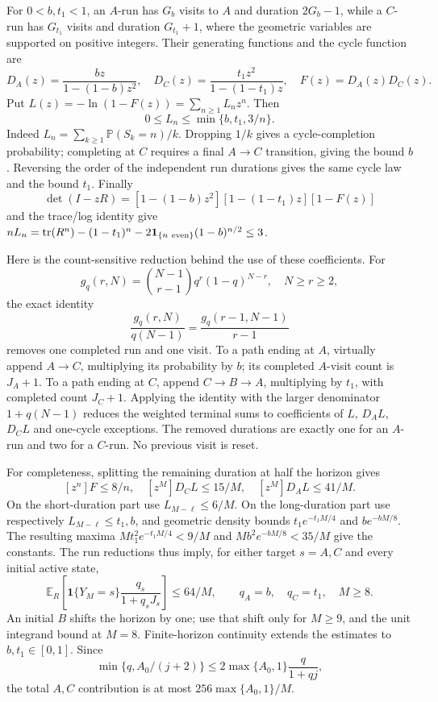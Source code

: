 \documentclass[11pt,letterpaper]{article}
\theoremstyle{definition}\newtheorem{definition}[theorem]{Definition}
\theoremstyle{remark}\newtheorem{remark}[theorem]{Remark}
\newcommand{\E}{\mathbb{E}}
\newcommand{\Prob}{\mathbb{P}}
\newcommand{\ind}{\mathbf{1}}
\begin{document}
For $0<b,t_1<1$, an $A$-run has $G_b$ visits to $A$ and duration $2G_b-1$, while a $C$-run has $G_{t_1}$ visits and duration $G_{t_1}+1$, where the geometric variables are supported on positive integers. Their generating functions and the cycle function are
\[
 D_A(z)=\frac{bz}{1-(1-b)z^2},\quad
 D_C(z)=\frac{t_1z^2}{1-(1-t_1)z},\quad
 F(z)=D_A(z)D_C(z).
\]
Put $L(z)=-\ln(1-F(z))=\sum_{n\ge1}L_nz^n$. Then
\begin{equation}\label{eq:renewalcoeff}
 0\le L_n\le\min\{b,t_1,3/n\}.
\end{equation}
Indeed $L_n=\sum_{k\ge1}\Prob(S_k=n)/k$. Dropping $1/k$ gives a cycle-completion probability; completing at $C$ requires a final $A\to C$ transition, giving the bound $b$. Reversing the order of the independent run durations gives the same cycle law and the bound $t_1$. Finally
\[
 \det(I-zR)=[1-(1-b)z^2][1-(1-t_1)z][1-F(z)]
\]
and the trace/log identity give
$nL_n=\operatorname{tr}(R^n)-(1-t_1)^n
-2\ind_{\{n\ {\rm even}\}}(1-b)^{n/2}\le3$.

Here is the count-sensitive reduction behind the use of these coefficients. For
\[
 g_q(r,N)=\binom{N-1}{r-1}q^r(1-q)^{N-r},\quad N\ge r\ge2,
\]
the exact identity
\[
 \frac{g_q(r,N)}{q(N-1)}
 =\frac{g_q(r-1,N-1)}{r-1}
\]
removes one completed run and one visit. To a path ending at $A$, virtually append $A\to C$, multiplying its probability by $b$; its completed $A$-visit count is $J_A+1$. To a path ending at $C$, append $C\to B\to A$, multiplying by $t_1$, with completed count $J_C+1$. Applying the identity with the larger denominator $1+q(N-1)$ reduces the weighted terminal sums to coefficients of $L$, $D_AL$, $D_CL$ and one-cycle exceptions. The removed durations are exactly one for an $A$-run and two for a $C$-run. No previous visit is reset.

For completeness, splitting the remaining duration at half the horizon gives
\[
 [z^n]F\le8/n,\quad
 [z^M]D_CL\le15/M,\quad [z^M]D_AL\le41/M.
\]
On the short-duration part use $L_{M-\ell}\le6/M$. On the long-duration part use respectively $L_{M-\ell}\le t_1,b$, and geometric density bounds
$t_1e^{-t_1M/4}$ and $be^{-bM/8}$. The resulting maxima
$Mt_1^2e^{-t_1M/4}<9/M$ and $Mb^2e^{-bM/8}<35/M$ give the constants. The run reductions thus imply, for either target $s=A,C$ and every initial active state,
\[
 \E_R\left[\ind\{Y_M=s\}\frac{q_s}{1+q_sJ_s}\right]\le64/M,
 \qquad q_A=b,\quad q_C=t_1,\quad M\ge8.
\]
An initial $B$ shifts the horizon by one; use that shift only for $M\ge9$, and the unit integrand bound at $M=8$. Finite-horizon continuity extends the estimates to $b,t_1\in[0,1]$. Since
\[
 \min\{q,A_0/(j+2)\}
 \le2\max\{A_0,1\}\frac q{1+qj},
\]
the total $A,C$ contribution is at most $256\max\{A_0,1\}/M$.
\end{document}
